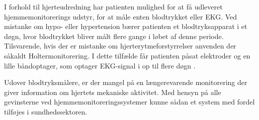 \noindent I forhold til hjerteudredning har patienten mulighed for at få udleveret hjemmemonitorerings udstyr, for at måle enten blodtrykket eller EKG. Ved mistanke om hypo- eller hypertension bærer patienten et blodtryksapparat i et døgn, hvor blodtrykket bliver målt flere gange i løbet af denne periode. Tilsvarende, hvis der er mistanke om hjerterytmeforstyrrelser anvenden der såkaldt Holtermonitorering. I dette tilfælde får patienten påsat elektroder og en lille båndoptager, som optager EKG-signal i op til flere døgn \cite{hjerud}.
 
Udover blodtryksmålere, er der mangel på en længerevarende monitorering der giver information om hjertets mekaniske aktivitet. Med hensyn på alle gevinsterne ved hjemmemonitoreringssystemer kunne sådan et system med fordel tilføjes i sundhedssektoren.